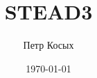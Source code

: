 
\usepackage{indentfirst}
\setmainlanguage{russian}
\title{STEAD3}
\author{Петр Косых}
\date{\today}
\sloppy

\maketitle
{
\hypersetup{linkcolor=black}
\renewcommand{\contentsname}{Оглавление}
\tableofcontents
\clearpage
}


